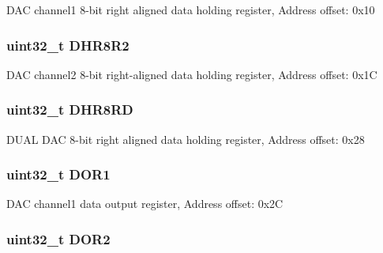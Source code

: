 D\-A\-C channel1 8-\/bit right aligned data holding register, Address offset\-: 0x10 \hypertarget{struct_d_a_c___type_def_a4c435f0e34ace4421241cd5c3ae87fc2}{
\subsubsection[{D\-H\-R8\-R2}]{ uint32\-\_\-t D\-H\-R8\-R2}}\label{struct_d_a_c___type_def_a4c435f0e34ace4421241cd5c3ae87fc2}
D\-A\-C channel2 8-\/bit right-\/aligned data holding register, Address offset\-: 0x1\-C \hypertarget{struct_d_a_c___type_def_a9590269cba8412f1be96b0ddb846ef44}{
\subsubsection[{D\-H\-R8\-R\-D}]{ uint32\-\_\-t D\-H\-R8\-R\-D}}\label{struct_d_a_c___type_def_a9590269cba8412f1be96b0ddb846ef44}
D\-U\-A\-L D\-A\-C 8-\/bit right aligned data holding register, Address offset\-: 0x28 \hypertarget{struct_d_a_c___type_def_aa710505be03a41981c35bacc7ce20746}{
\subsubsection[{D\-O\-R1}]{ uint32\-\_\-t D\-O\-R1}}\label{struct_d_a_c___type_def_aa710505be03a41981c35bacc7ce20746}
D\-A\-C channel1 data output register, Address offset\-: 0x2\-C \hypertarget{struct_d_a_c___type_def_aba9fb810b0cf6cbc1280c5c63be2418b}{
\subsubsection[{D\-O\-R2}]{ uint32\-\_\-t D\-O\-R2}}\label{struct_d_a_c___type_def_aba9fb810b0cf6cbc1280c5c63be2418b}
